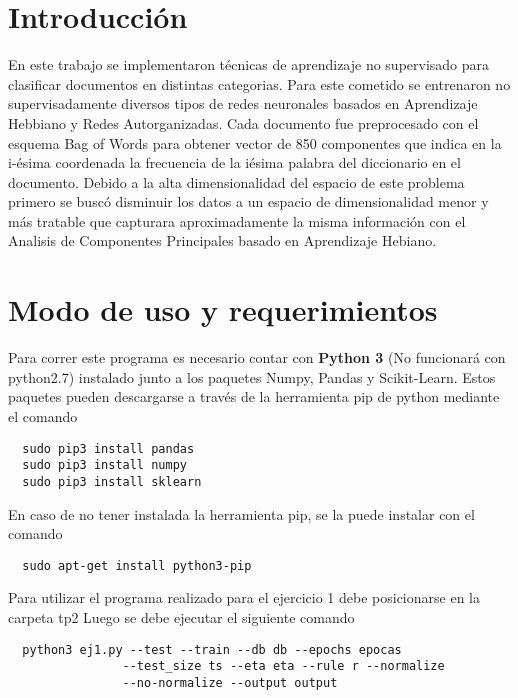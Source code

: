 \section{Introducción}

En este trabajo se implementaron técnicas de aprendizaje no supervisado para
clasificar documentos en distintas categorias. Para este cometido se entrenaron no
supervisadamente diversos tipos de redes neuronales basados en Aprendizaje Hebbiano y
Redes Autorganizadas. Cada documento fue preprocesado con el esquema Bag of
Words para obtener vector de 850 componentes que indica en la i-ésima coordenada
la frecuencia de la iésima palabra del diccionario en el documento.
Debido a la alta dimensionalidad del espacio de este problema primero se buscó
disminuir los datos a un espacio de dimensionalidad menor y más tratable que
capturara aproximadamente la misma información con el Analisis de Componentes
Principales basado en Aprendizaje Hebiano.


\section{Modo de uso y requerimientos}
Para correr este programa es necesario contar con \textbf{Python 3} (No funcionará con python2.7) instalado junto a los paquetes Numpy, Pandas y Scikit-Learn. Estos paquetes pueden descargarse a través
de la herramienta pip de python mediante el comando
\begin{verbatim}
  sudo pip3 install pandas
  sudo pip3 install numpy
  sudo pip3 install sklearn
\end{verbatim}
En caso de no tener instalada la herramienta pip, se la puede instalar con el comando
\begin{verbatim}
  sudo apt-get install python3-pip
\end{verbatim}

Para utilizar el programa realizado para el ejercicio 1 debe posicionarse en la carpeta tp2 Luego se debe ejecutar el siguiente comando
\begin{verbatim}
  python3 ej1.py --test --train --db db --epochs epocas
                --test_size ts --eta eta --rule r --normalize
                --no-normalize --output output
\end{verbatim}

